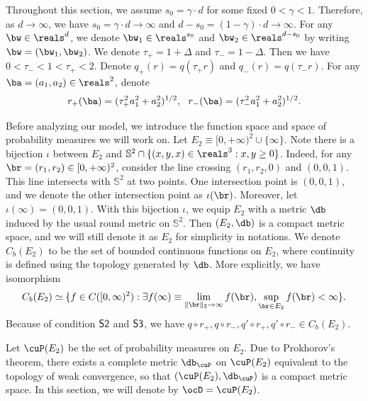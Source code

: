 \documentclass[11pt]{article}
\begin{document}
Throughout this section, we assume $s_0 = \gamma \cdot d$ for some fixed $0 < \gamma < 1$. Therefore, as $d \to \infty$, we have $s_0 = \gamma \cdot d \to \infty$ and $d - s_0 = (1 - \gamma)\cdot d \to \infty$. For any $\bw \in \reals^d$, we denote $\bw_1 \in \reals^{s_0}$ and $\bw_2 \in \reals^{d - s_0}$ by writing $\bw = (\bw_1, \bw_2)$. We denote $\tau_{+} = 1 + \Delta$ and $\tau_- = 1 - \Delta$. Then we have $0 < \tau_{-} < 1 < \tau_{+} < 2$. Denote $q_{+}(r) = q(\tau_{+} r)$ and $q_{-}(r) = q(\tau_{-} r)$. For any $\ba = (a_1, a_2) \in \reals^2$, denote
\begin{align}
r_+(\ba) = (\tau_{+}^2 a_1^2 + a_2^2)^{1/2}, ~~ r_-(\ba) = (\tau_{-}^2 a_1^2 + a_2^2)^{1/2}. 
\end{align}

Before analyzing our model, we introduce the function space and space of probability measures we will work on. Let $E_2 \equiv [0, +\infty)^2 \cup \{ \infty \}$. Note there is a bijection $\iota$ between $E_2$ and $\mathbb S^2 \cap \{(x, y, x) \in \reals^3: x, y \ge 0\}$. Indeed, for any $\br = (r_1, r_2) \in [0, +\infty)^2$, consider the line crossing $(r_1, r_2, 0)$ and $(0, 0, 1)$. This line intersects with $\mathbb S^2$ at two points. One intersection point is $(0, 0, 1)$, and we denote the other intersection point as $\iota(\br)$. Moreover, let $\iota(\infty) = (0, 0, 1)$. With this bijection $\iota$, we equip $E_2$ with a metric $\db$ induced by the usual round metric on $\mathbb S^2$. Then $(E_2, \db)$ is a compact metric space, and we will still denote it as $E_2$ for simplicity in notations. We denote $C_b(E_2)$ to be the set of bounded continuous functions on $E_2$, where continuity is defined using the topology generated by $\db$. More explicitly, we have isomorphism
\begin{equation}
C_b(E_2) \simeq \{ f \in C([0, \infty)^2): \exists f(\infty) \equiv \lim_{\| \br \|_2 \to \infty} f(\br),  \sup_{\br \in E_2} f(\br) < \infty \}. 
\end{equation}
Because of condition ${\sf S2}$ and ${\sf S3}$, we have $q \circ r_+, q \circ r_-, q' \circ r_+, q' \circ r_- \in C_b(E_2)$. 

Let $\cuP(E_2)$ be the set of probability measures on $E_2$. Due to Prokhorov's theorem, there exists a complete metric $\db_\cuP$ on $\cuP(E_2)$ equivalent to the topology of weak convergence, so that $(\cuP(E_2), \db_\cuP)$ is a compact metric space. In this section, we will denote by $\ocD = \cuP(E_2)$. 
\end{document}
